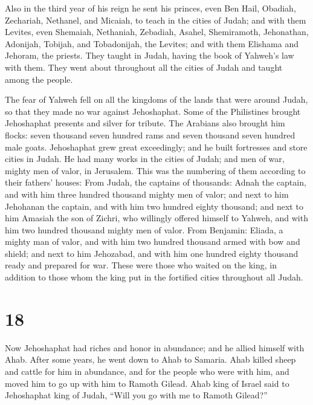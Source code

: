  Also in the third year of his reign he sent his princes,
even Ben Hail, Obadiah, Zechariah, Nethanel, and Micaiah, to teach in
the cities of Judah;  and with them Levites, even Shemaiah,
Nethaniah, Zebadiah, Asahel, Shemiramoth, Jehonathan, Adonijah, Tobijah,
and Tobadonijah, the Levites; and with them Elishama and Jehoram, the
priests.  They taught in Judah, having the book of Yahweh's
law with them. They went about throughout all the cities of Judah and
taught among the people.

 The fear of Yahweh fell on all the kingdoms of the lands
that were around Judah, so that they made no war against Jehoshaphat.
 Some of the Philistines brought Jehoshaphat presents and
silver for tribute. The Arabians also brought him flocks: seven thousand
seven hundred rams and seven thousand seven hundred male goats.
 Jehoshaphat grew great exceedingly; and he built
fortresses and store cities in Judah.  He had many works in
the cities of Judah; and men of war, mighty men of valor, in Jerusalem.
 This was the numbering of them according to their fathers'
houses: From Judah, the captains of thousands: Adnah the captain, and
with him three hundred thousand mighty men of valor;  and
next to him Jehohanan the captain, and with him two hundred eighty
thousand;  and next to him Amasiah the son of Zichri, who
willingly offered himself to Yahweh, and with him two hundred thousand
mighty men of valor.  From Benjamin: Eliada, a mighty man
of valor, and with him two hundred thousand armed with bow and shield;
 and next to him Jehozabad, and with him one hundred eighty
thousand ready and prepared for war.  These were those who
waited on the king, in addition to those whom the king put in the
fortified cities throughout all Judah.

\hypertarget{section-17}{%
\section{18}\label{section-17}}

 Now Jehoshaphat had riches and honor in abundance; and he
allied himself with Ahab.  After some years, he went down to
Ahab to Samaria. Ahab killed sheep and cattle for him in abundance, and
for the people who were with him, and moved him to go up with him to
Ramoth Gilead.  Ahab king of Israel said to Jehoshaphat king
of Judah, ``Will you go with me to Ramoth Gilead?''


